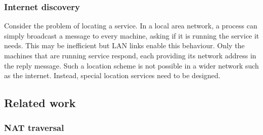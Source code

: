
\subsubsection{Internet discovery}

Consider the problem of locating a service. In a local area network, a process can simply broadcast a message to every machine, asking if it is running the service it needs. This may be inefficient but LAN links enable this behaviour. Only the machines that are running service respond, each providing its network address in the reply message. Such a location scheme is not possible in a wider network such as the internet. Instead, special location services need to be designed.\cite{tanenbaum2007distributed}

\subsection{Related work}

\subsubsection{NAT traversal}

